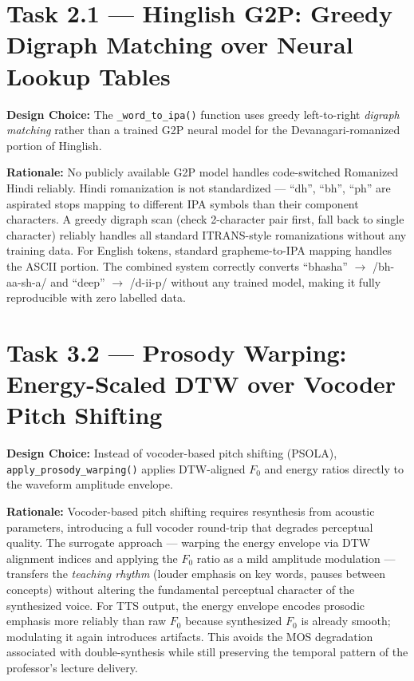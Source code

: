 \documentclass[11pt,onecolumn]{article}
\begin{document}
\section{Task 2.1 --- Hinglish G2P: Greedy Digraph Matching over Neural Lookup Tables}

\textbf{Design Choice:} The \texttt{\_word\_to\_ipa()} function uses greedy left-to-right
\textit{digraph matching} rather than a trained G2P neural model for the Devanagari-romanized
portion of Hinglish.

\textbf{Rationale:} No publicly available G2P model handles code-switched Romanized Hindi
reliably. Hindi romanization is not standardized --- ``dh'', ``bh'', ``ph'' are aspirated stops
mapping to different IPA symbols than their component characters. A greedy digraph scan (check
2-character pair first, fall back to single character) reliably handles all standard ITRANS-style
romanizations without any training data. For English tokens, standard grapheme-to-IPA mapping
handles the ASCII portion. The combined system correctly converts
``bhasha'' $\rightarrow$ /bh-aa-sh-a/ and ``deep'' $\rightarrow$ /d-ii-p/
without any trained model, making it fully reproducible with zero labelled data.

\section{Task 3.2 --- Prosody Warping: Energy-Scaled DTW over Vocoder Pitch Shifting}

\textbf{Design Choice:} Instead of vocoder-based pitch shifting (PSOLA), \texttt{apply\_prosody\_warping()} applies DTW-aligned $F_0$ and energy
ratios directly to the waveform amplitude envelope.

\textbf{Rationale:} Vocoder-based pitch shifting requires resynthesis from acoustic parameters,
introducing a full vocoder round-trip that degrades perceptual quality. The surrogate approach
--- warping the energy envelope via DTW alignment indices and applying the $F_0$ ratio as a mild
amplitude modulation --- transfers the \textit{teaching rhythm} (louder emphasis on key words,
pauses between concepts) without altering the fundamental perceptual character of the synthesized
voice. For TTS output, the energy envelope encodes prosodic emphasis more reliably than raw $F_0$
because synthesized $F_0$ is already smooth; modulating it again introduces artifacts. This avoids
the MOS degradation associated with double-synthesis while still preserving the temporal pattern
of the professor's lecture delivery.
\end{document}

